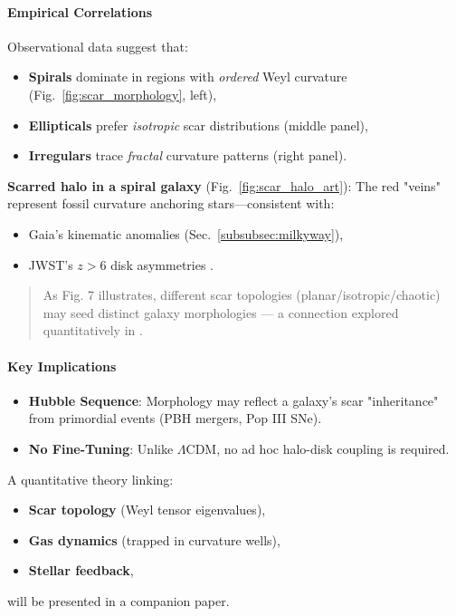 \documentclass{article}
\begin{document}
\paragraph{Empirical Correlations}  
Observational data suggest that:  
\begin{itemize}  
  \item \textbf{Spirals} dominate in regions with \textit{ordered} Weyl curvature (Fig.~\ref{fig:scar_morphology}, left),  
  \item \textbf{Ellipticals} prefer \textit{isotropic} scar distributions (middle panel),  
  \item \textbf{Irregulars} trace \textit{fractal} curvature patterns (right panel).  
\end{itemize}  

\begin{tcolorbox}[colback=boxnormal,colframe=blue!50!black,title=Artistic Illustration]  
  \textbf{Scarred halo in a spiral galaxy} (Fig.~\ref{fig:scar_halo_art}):  
  The red "veins" represent fossil curvature anchoring stars—consistent with:  
  \begin{itemize}  
    \item Gaia's kinematic anomalies (Sec.~\ref{subsubsec:milkyway}),  
    \item JWST's $z>6$ disk asymmetries \citep{Shamir2025}.  
  \end{itemize}  
\end{tcolorbox}  

\begin{quote}
    As Fig. 7 illustrates, different scar topologies (planar/isotropic/chaotic) may seed distinct galaxy morphologies — a connection explored quantitatively in \cite{Bertran2024ScarredHubble}.
\end{quote}

\paragraph{Key Implications}  
\begin{itemize}  
  \item \textbf{Hubble Sequence}: Morphology may reflect a galaxy's scar "inheritance" from primordial events (PBH mergers, Pop III SNe).  
  \item \textbf{No Fine-Tuning}: Unlike $\Lambda$CDM, no ad hoc halo-disk coupling is required.  
\end{itemize}  

\begin{tcolorbox}[colback=boximpact,colframe=red!75!black,title=Future Work]  
A quantitative theory linking:  
\begin{itemize}  
  \item \textbf{Scar topology} (Weyl tensor eigenvalues),  
  \item \textbf{Gas dynamics} (trapped in curvature wells),  
  \item \textbf{Stellar feedback},  
\end{itemize}  
will be presented in a companion paper.  
\end{tcolorbox}  
\end{document}
